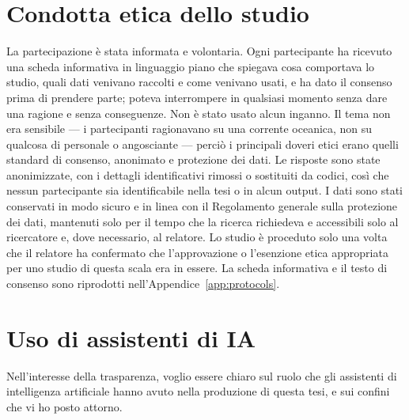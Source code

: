 \section{Condotta etica dello studio}
\label{app:ethics-conduct}

La partecipazione è stata informata e volontaria. Ogni partecipante ha ricevuto una scheda informativa in linguaggio piano che spiegava cosa comportava lo studio, quali dati venivano raccolti e come venivano usati, e ha dato il consenso prima di prendere parte; poteva interrompere in qualsiasi momento senza dare una ragione e senza conseguenze. Non è stato usato alcun inganno. Il tema non era sensibile --- i partecipanti ragionavano su una corrente oceanica, non su qualcosa di personale o angosciante --- perciò i principali doveri etici erano quelli standard di consenso, anonimato e protezione dei dati. Le risposte sono state anonimizzate, con i dettagli identificativi rimossi o sostituiti da codici, così che nessun partecipante sia identificabile nella tesi o in alcun output. I dati sono stati conservati in modo sicuro e in linea con il Regolamento generale sulla protezione dei dati, mantenuti solo per il tempo che la ricerca richiedeva e accessibili solo al ricercatore e, dove necessario, al relatore. Lo studio è proceduto solo una volta che il relatore ha confermato che l'approvazione o l'esenzione etica appropriata per uno studio di questa scala era in essere. La scheda informativa e il testo di consenso sono riprodotti nell'Appendice~\ref{app:protocols}.
\section{Uso di assistenti di IA}
\label{app:ai-use}

Nell'interesse della trasparenza, voglio essere chiaro sul ruolo che gli assistenti di intelligenza artificiale hanno avuto nella produzione di questa tesi, e sui confini che vi ho posto attorno.

